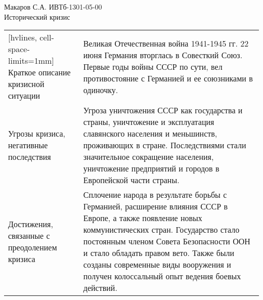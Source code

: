 \documentclass[a4paper,14pt]{extarticle}
\begin{document}
	\pagestyle{empty}
	\noindent Макаров С.А. ИВТб-1301-05-00 \\
	Исторический кризис \\
	
	\noindent
	\begin{NiceTabular}{p{50mm}p{133mm}}[hvlines, cell-space-limits=1mm]
		Краткое описание кризисной ситуации &
		Великая Отечественная война 1941-1945 гг. 22 июня Германия вторглась в Совесткий Союз. Первые годы войны СССР по сути, вел противостояние с Германией и ее союзниками в одиночку. \\
		
		Угрозы кризиса, негативные последствия &
		Угроза уничтожения СССР как государства и страны, уничтожение и эксплуатация славянского населения и меньшинств, проживающих в стране. Последствиями стали значительное сокращение населения, уничтожение предприятий и городов в Европейской части страны. \\
		
		Достижения, связанные с преодолением кризиса &
		Сплочение народа в результате борьбы с Германией, расширение влияния СССР в Европе, а также появление новых коммунистических стран. Государство стало постоянным членом Совета Безопасности ООН и стало обладать правом вето. Также были созданы современные виды вооружения и получен колоссальный опыт ведения боевых действий.
	\end{NiceTabular}
\end{document}

